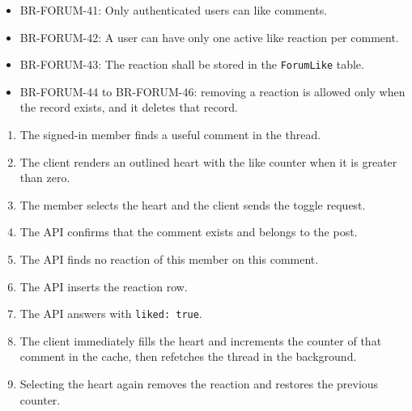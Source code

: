 \begin{itemize}[leftmargin=1.6em,topsep=3pt,itemsep=2pt,parsep=0pt,label=$\bullet$]\brrulelist
      \item BR-FORUM-41: Only authenticated users can like comments.
      \item BR-FORUM-42: A user can have only one active like reaction per comment.
      \item BR-FORUM-43: The reaction shall be stored in the \texttt{ForumLike} table.
      \item BR-FORUM-44 to BR-FORUM-46: removing a reaction is allowed only when the record
            exists, and it deletes that record.
\end{itemize}

\begin{enumerate}[leftmargin=1.8em,topsep=3pt,itemsep=2pt,parsep=0pt]
      \item The signed-in member finds a useful comment in the thread.
      \item The client renders an outlined heart with the like counter when it is greater
            than zero.
      \item The member selects the heart and the client sends the toggle request.
      \item The API confirms that the comment exists and belongs to the post.
      \item The API finds no reaction of this member on this comment.
      \item The API inserts the reaction row.
      \item The API answers with \texttt{liked: true}.
      \item The client immediately fills the heart and increments the counter of that
            comment in the cache, then refetches the thread in the background.
      \item Selecting the heart again removes the reaction and restores the previous
            counter.
\end{enumerate}


